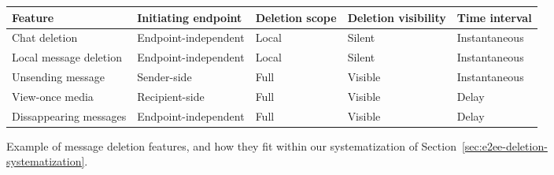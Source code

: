 \begin{figure}[t!]
    \centering
    \begin{tabular}{l|llll}
     \toprule
     \textbf{Feature} & \textbf{Initiating endpoint} & \textbf{Deletion scope} & \textbf{Deletion visibility} & \textbf{Time interval}\\ 
     \midrule
    Chat deletion & Endpoint-independent & Local & Silent & Instantaneous \\
    Local message deletion & Endpoint-independent & Local & Silent & Instantaneous \\
    Unsending message & Sender-side & Full & Visible & Instantaneous \\
    View-once media & Recipient-side & Full & Visible &  Delay \\
    Dissappearing messages & Endpoint-independent & Full & Visible & Delay \\
    \bottomrule
\end{tabular}
\caption{Example of message deletion features, and how they fit within our systematization of Section~\ref{sec:e2ee-deletion-systematization}.}\label{fig:deletion-features-systematization-examples}
\end{figure}